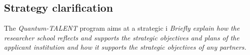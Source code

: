 \documentclass{scrreprt}
\begin{document}
\begin{comment}
\textbf{Key Topics:}
\begin{itemize}
\item Data encoding and quantum feature maps: methods to input classical data into quantum computers (one-hot/basis encoding, amplitude encoding, parameterized feature maps) and how these define a feature space for quantum models.
\item Quantum linear algebra subroutines for ML: quantum algorithms for solving linear systems (the HHL algorithm), eigen-decomposition (quantum principal component analysis), and their relevance to machine learning applications.
\item Quantum-enhanced learning models: quantum support vector machines (using quantum kernel estimation), quantum clustering and nearest-neighbor algorithms, and quantum recommendation system approaches.
\item Quantum neural networks and parametrized quantum circuits: designing quantum circuits with tunable parameters as analogues to neural network models, training these circuits (e.g., via gradient descent or other optimizers), and considerations like barren plateaus in the training landscape.
\item Hybrid quantum-classical algorithms in ML: The \textit{variational quantum eigensolver} (VQE) and \textit{quantum approximate optimizato in algorithm} (QAOA) as examples of using quantum subroutines within classical optimization loops; applications of these hybrid methods to optimization problems and supervised learning tasks.
\item QML software frameworks and tools: introduction to libraries such as TensorFlow Quantum, PennyLane, or Qiskit Machine Learning, which enable the simulation and integration of quantum models into classical machine learning workflows.
\item Emerging applications and case studies: discussion of recent demonstrations and research in QML (e.g., quantum-enhanced data classification in chemistry or finance), and an assessment of what future advances are needed to achieve real-world impact.
\end{itemize}
\end{comment}
\subsection{Strategy clarification}
The \textit{Quantum-TALENT} program aims at a strategic i
\textit{Briefly explain how the researcher school reflects and supports the strategic objectives and plans of the applicant institution and how it supports the strategic objectives of any partners.}
\end{document}
